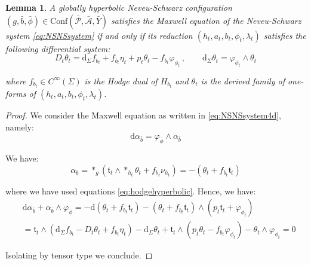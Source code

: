 \documentclass[10pt,reqno,a4paper]{amsart}
\theoremstyle{plain}
\newtheorem{lemma}[thm]{Lemma}
\theoremstyle{definition}
\theoremstyle{remark}
\theoremstyle{remark}
\def\dd{\mathrm{d}}
\def\Conf{\mathrm{Conf}}
\def\cA{\mathcal{A}}
\def\cP{\mathcal{P}}
\renewcommand{\(}{ (}
\renewcommand{\)}{ )}
\begin{document}
\begin{lemma}
\label{lemma:Maxwellgh}
A globally hyperbolic Neveu-Schwarz configuration $(g,\bar{b},\bar{\phi})\in \Conf(\bar{\cP},\bar{\cA},\bar{Y})$ satisfies the Maxwell equation of the Neveu-Schwarz system \eqref{eq:NSNSsystem} if and only if its reduction $( h_t , a_t , b_t , \phi_t,\lambda_t)$ satisfies the following differential system:
\begin{equation*}
D_t \theta_t = \dd_{\Sigma} f_{b_t} + f_{b_t}\eta_t+p_t\theta_t-f_{b_t}\varphi_{\phi_t}  \, , \qquad \dd_{\Sigma} \theta_t = \varphi_{\phi_t} \wedge \theta_t
\end{equation*}
	
\noindent
where $f_{b_t}\in C^{\infty}(\Sigma)$ is the Hodge dual of $H_{b_t}$ and $\theta_t$ is the derived family of one-forms of $( h_t , a_t , b_t , \phi_t,\lambda_t)$. 
\end{lemma}

\begin{proof}
We consider the Maxwell equation as written in \eqref{eq:NSNSsystem4d}, namely:
\begin{equation*}
\dd \alpha_{\bar{b}} = \varphi_{\bar{\phi}} \wedge \alpha_{\bar{b}}
\end{equation*}

\noindent
We have:
\begin{equation*}
\alpha_{\bar{b}} = \ast_g (\mathfrak{t}_t \wedge \ast_{h_t}\theta_t + f_{b_t} \nu_{h_t}) = - (\theta_t + f_{b_t} \mathfrak{t}_t)
\end{equation*}

\noindent
where we have used equations \eqref{eq:hodgehyperbolic}. Hence, we have:
\begin{eqnarray*}
& \dd \alpha_{\bar{b}} + \alpha_{\bar{b}}\wedge \varphi_{\bar{\phi}} = -\dd (\theta_t + f_{b_t} \mathfrak{t}_t) - (\theta_t + f_{b_t} \mathfrak{t}_t) \wedge (p_t \mathfrak{t}_t + \varphi_{\phi_t})\\
& = \mathfrak{t}_t\wedge (\dd_{\Sigma} f_{b_t} - D_t \theta_t+f_{b_t}\eta_t) - \dd_{\Sigma} \theta_t + \mathfrak{t}_t \wedge (p_t\theta_t - f_{b_t}\varphi_{\phi_t})-\theta_t\wedge\varphi_{\phi_t} = 0
\end{eqnarray*}

\noindent
Isolating by tensor type we conclude.
\end{proof}
\end{document}
